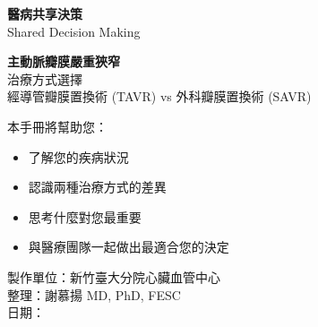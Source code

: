 \documentclass[12pt,a4paper]{article}
\begin{document}
\begin{center}
\vspace*{1cm}

{\fontsize{28}{34}\selectfont\bfseries\textcolor{emergency_red}{醫病共享決策}}\\[0.3cm]
{\fontsize{20}{24}\selectfont\textcolor{emergency_blue}{Shared Decision Making}}\\[1.5cm]


\vspace{1cm}

{\fontsize{24}{30}\selectfont\bfseries 主動脈瓣膜嚴重狹窄}\\[0.5cm]
{\fontsize{20}{24}\selectfont\textcolor{emergency_blue}{治療方式選擇}}\\[0.3cm]
{\large\textcolor{emergency_gray}{經導管瓣膜置換術 (TAVR) vs 外科瓣膜置換術 (SAVR)}}\\[2cm]


\vspace{2cm}

{\large 本手冊將幫助您：}\\[0.3cm]
\begin{minipage}{0.7\textwidth}
\begin{itemize}[leftmargin=*, itemsep=8pt]
    \item[\textcolor{emergency_blue}{\textbullet}] 了解您的疾病狀況
    \item[\textcolor{emergency_blue}{\textbullet}] 認識兩種治療方式的差異
    \item[\textcolor{emergency_blue}{\textbullet}] 思考什麼對您最重要
    \item[\textcolor{emergency_blue}{\textbullet}] 與醫療團隊一起做出最適合您的決定
\end{itemize}
\end{minipage}

\vfill

{\normalsize 製作單位：新竹臺大分院心臟血管中心}\\[0.2cm]
{\small 整理：謝慕揚 MD, PhD, FESC}\\[0.2cm]
{\small 日期：\mydate}

\end{center}
\end{document}
